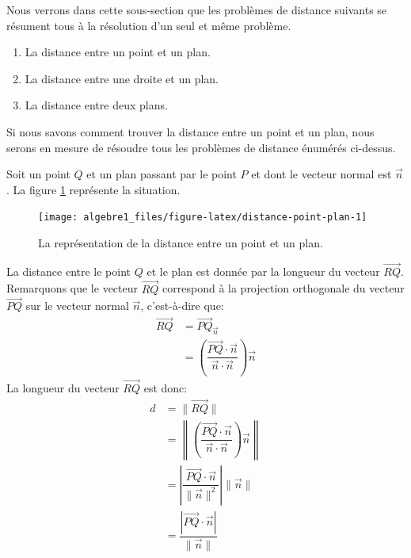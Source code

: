 \documentclass[]{book}
\providecommand{\tightlist}{%
  \setlength{\itemsep}{0pt}\setlength{\parskip}{0pt}}
\theoremstyle{definition}
\theoremstyle{definition}
\theoremstyle{definition}
\theoremstyle{remark}
\begin{document}
Nous verrons dans cette sous-section que les problèmes de distance suivants se résument tous à la résolution d'un seul et même problème.

\begin{enumerate}
\def\labelenumi{\arabic{enumi}.}
\tightlist
\item
  La distance entre un point et un plan.
\item
  La distance entre une droite et un plan.
\item
  La distance entre deux plans.
\end{enumerate}

Si nous savons comment trouver la distance entre un point et un plan, nous serons en mesure de résoudre tous les problèmes de distance énumérés ci-dessus.

Soit un point \(Q\) et un plan passant par le point \(P\) et dont le vecteur normal est \(\vec n\). La figure \ref{fig:distance-point-plan} représente la situation.

\begin{figure}

{\centering \texttt{[image: algebre1\_files/figure-latex/distance-point-plan-1]} 

}

\caption{La représentation de la distance entre un point et un plan.}\label{fig:distance-point-plan}
\end{figure}

La distance entre le point \(Q\) et le plan est donnée par la longueur du vecteur \(\overrightarrow{RQ}\). Remarquons que le vecteur \(\overrightarrow{RQ}\) correspond à la projection orthogonale du vecteur \(\overrightarrow{PQ}\) sur le vecteur normal \(\vec n\), c'est-à-dire que:
\begin{align*}
\overrightarrow{RQ} &= \overrightarrow{PQ}_{\overrightarrow{n}} \\
&= \left(\dfrac{\overrightarrow{PQ}\cdot \vec n}{\vec n \cdot \vec n}\right)\vec n
\end{align*}
La longueur du vecteur \(\overrightarrow{RQ}\) est donc:
\begin{align*}
d &= \lVert\overrightarrow{RQ}\rVert \\
&= \left\lVert\left(\dfrac{\overrightarrow{PQ}\cdot \vec n}{\vec n \cdot \vec n}\right)\vec n\right\rVert \\
&= \left|\dfrac{\overrightarrow{PQ}\cdot \vec n}{\lVert\vec n\rVert^2}\right| \lVert\vec n\rVert \\
&= \dfrac{|\overrightarrow{PQ}\cdot \vec n|}{\lVert\vec n\rVert}
\end{align*}
\end{document}
